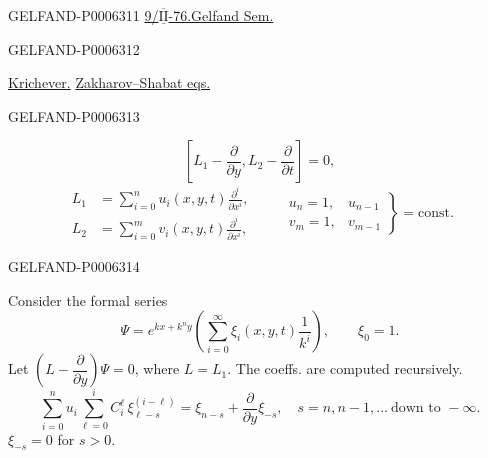 \begin{GelfandAdjacentEvidence}{GELFAND-P000631}{1}
\underline{9/\(\overline{\underline{\mathrm{II}}}\)-76.}\qquad\underline{Gelfand Sem.}
\end{GelfandAdjacentEvidence}
\begin{GelfandAdjacentEvidence}{GELFAND-P000631}{2}

\underline{Krichever.}
\underline{Zakharov--Shabat eqs.}
\end{GelfandAdjacentEvidence}
\begin{GelfandAdjacentEvidence}{GELFAND-P000631}{3}

\begin{equation*}
\left[L_1-\frac{\partial}{\partial y},L_2-\frac{\partial}{\partial t}\right]=0,\tag{1}
\end{equation*}
\[
\begin{aligned}
L_1&=\sum_{i=0}^n u_i(x,y,t)\frac{\partial^i}{\partial x^i},\\
L_2&=\sum_{i=0}^m v_i(x,y,t)\frac{\partial^i}{\partial x^i},
\end{aligned}
\qquad
\left.\begin{array}{ll}u_n=1,&u_{n-1}\\v_m=1,&v_{m-1}\end{array}\right\}
=\mathrm{const}.
\]
\end{GelfandAdjacentEvidence}
\begin{GelfandAdjacentEvidence}{GELFAND-P000631}{4}


Consider the formal series
\begin{equation*}
\Psi=e^{kx+k^ny}\left(\sum_{i=0}^{\infty}\xi_i(x,y,t)\frac{1}{k^i}\right),
\qquad \xi_0=1.\tag{2}
\end{equation*}
Let \(\left(L-\dfrac{\partial}{\partial y}\right)\Psi=0\), where \(L=L_1\).
The coeffs. are computed recursively.
\begin{equation*}
\sum_{i=0}^n u_i\sum_{\ell=0}^i C_i^\ell\,\xi_{\ell-s}^{(i-\ell)}
=\xi_{n-s}+\frac{\partial}{\partial y}\xi_{-s},
\quad s=n,n-1,\ldots\ \text{down to }-\infty.\tag{3}
\end{equation*}
\(\xi_{-s}=0\) for \(s>0\).
\end{GelfandAdjacentEvidence}
